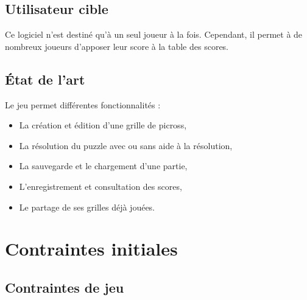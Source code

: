 \documentclass[11pt]{article}
\begin{document}
\subsection{Utilisateur cible}

Ce logiciel n'est destiné qu'à un seul joueur à la fois. Cependant, il permet à de nombreux joueurs d'apposer leur score à la table des scores.


\subsection{État de l'art}

Le jeu permet différentes fonctionnalités :
\begin{itemize}
   \item La création et édition d'une grille de picross,
   \item La résolution du puzzle avec ou sans aide à la résolution,
   \item La sauvegarde et le chargement d'une partie,
   \item L'enregistrement et consultation des scores,
   \item Le partage de ses grilles déjà jouées.
\end{itemize}




\section{Contraintes initiales}


\subsection{Contraintes de jeu}
\end{document}
